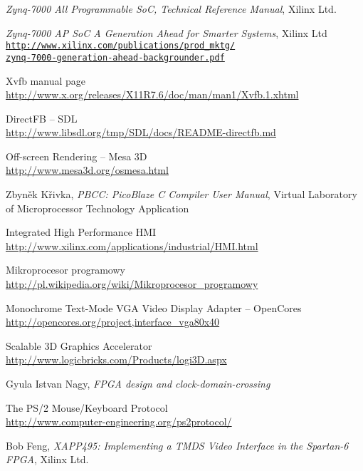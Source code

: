 \begin{thebibliography}{1}
	\textit{Zynq-7000 All Programmable SoC, Technical Reference Manual},
	Xilinx Ltd.
	
 \textit{Zynq-7000 AP SoC A Generation Ahead for Smarter Systems},
	Xilinx Ltd \\
	\href{http://www.xilinx.com/publications/prod\_mktg/zynq-7000-generation-ahead-backgrounder.pdf}
	{\texttt{http://www.xilinx.com/publications/prod\_mktg/\\zynq-7000-generation-ahead-backgrounder.pdf}}
	
 Xvfb manual page \\
	\url{http://www.x.org/releases/X11R7.6/doc/man/man1/Xvfb.1.xhtml}

 DirectFB -- SDL \\
	\url{http://www.libsdl.org/tmp/SDL/docs/README-directfb.md}

 Off-screen Rendering -- Mesa 3D \\
	\url{http://www.mesa3d.org/osmesa.html}

 Zbyněk Křivka,
	\textit{PBCC: PicoBlaze C Compiler User Manual},
	Virtual Laboratory of Microprocessor Technology Application
		
 Integrated High Performance HMI \\
	\url{http://www.xilinx.com/applications/industrial/HMI.html}
	
 Mikroprocesor programowy \\
	\url{http://pl.wikipedia.org/wiki/Mikroprocesor\_programowy}
	
 Monochrome Text-Mode VGA Video Display Adapter -- OpenCores \\
	\url{http://opencores.org/project,interface\_vga80x40}
	
 Scalable 3D Graphics Accelerator \\
	\url{http://www.logicbricks.com/Products/logi3D.aspx}

 Gyula Istvan Nagy,
	\textit{FPGA design and clock-domain-crossing}

 The PS/2 Mouse/Keyboard Protocol \\
	\url{http://www.computer-engineering.org/ps2protocol/}

 Bob Feng,
	\textit{XAPP495: Implementing a TMDS Video Interface in the Spartan-6 FPGA},
	Xilinx Ltd.


\end{thebibliography}
